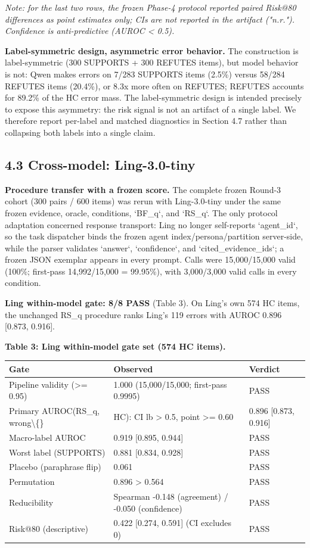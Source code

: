 \documentclass[11pt]{article}
\begin{document}
\emph{Note: for the last two rows, the frozen Phase-4 protocol reported paired Risk@80 differences as point estimates only; CIs are not reported in the artifact ("n.r."). Confidence is anti-predictive (AUROC < 0.5).}

\textbf{Label-symmetric design, asymmetric error behavior.} The construction is label-symmetric (300 SUPPORTS + 300 REFUTES items), but model behavior is not: Qwen makes errors on 7/283 SUPPORTS items (2.5\%) versus 58/284 REFUTES items (20.4\%), or 8.3x more often on REFUTES; REFUTES accounts for 89.2\% of the HC error mass. The label-symmetric design is intended precisely to expose this asymmetry: the risk signal is not an artifact of a single label. We therefore report per-label and matched diagnostics in Section 4.7 rather than collapsing both labels into a single claim.

\subsection{4.3 Cross-model: Ling-3.0-tiny}

\textbf{Procedure transfer with a frozen score.} The complete frozen Round-3 cohort (300 pairs / 600 items) was rerun with Ling-3.0-tiny under the same frozen evidence, oracle, conditions, `BF\_q`, and `RS\_q`. The only protocol adaptation concerned response transport: Ling no longer self-reports `agent\_id`, so the task dispatcher binds the frozen agent index/persona/partition server-side, while the parser validates `answer`, `confidence`, and `cited\_evidence\_ids`; a frozen JSON exemplar appears in every prompt. Calls were 15,000/15,000 valid (100\%; first-pass 14,992/15,000 = 99.95\%), with 3,000/3,000 valid calls in every condition.

\textbf{Ling within-model gate: 8/8 PASS} (Table 3). On Ling's own 574 HC items, the unchanged RS\_q procedure ranks Ling's 119 errors with AUROC 0.896 [0.873, 0.916].

\textbf{Table 3: Ling within-model gate set (574 HC items).}

\begin{table}[t]
\centering
\small
\begin{tabular}{lll}
\toprule
Gate & Observed & Verdict \\
\midrule
Pipeline validity (>= 0.95) & 1.000 (15,000/15,000; first-pass 0.9995) & PASS \\
Primary AUROC(RS\_q, wrong\textbackslash\{\} & HC): CI lb > 0.5, point >= 0.60 & 0.896 [0.873, 0.916] \\
Macro-label AUROC & 0.919 [0.895, 0.944] & PASS \\
Worst label (SUPPORTS) & 0.881 [0.834, 0.928] & PASS \\
Placebo (paraphrase flip) & 0.061 & PASS \\
Permutation & 0.896 > 0.564 & PASS \\
Reducibility & Spearman -0.148 (agreement) / -0.050 (confidence) & PASS \\
Risk@80 (descriptive) & 0.422 [0.274, 0.591] (CI excludes 0) & PASS \\
\bottomrule
\end{tabular}
\end{table}
\end{document}
